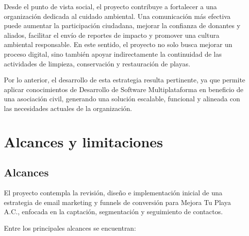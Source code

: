 Desde el punto de vista social, el proyecto contribuye a fortalecer a una organización dedicada al cuidado ambiental. Una comunicación más efectiva puede aumentar la participación ciudadana, mejorar la confianza de donantes y aliados, facilitar el envío de reportes de impacto y promover una cultura ambiental responsable. En este sentido, el proyecto no solo busca mejorar un proceso digital, sino también apoyar indirectamente la continuidad de las actividades de limpieza, conservación y restauración de playas.

Por lo anterior, el desarrollo de esta estrategia resulta pertinente, ya que permite aplicar conocimientos de Desarrollo de Software Multiplataforma en beneficio de una asociación civil, generando una solución escalable, funcional y alineada con las necesidades actuales de la organización.

\section{Alcances y limitaciones}

\subsection{Alcances}

El proyecto contempla la revisión, diseño e implementación inicial de una estrategia de email marketing y funnels de conversión para Mejora Tu Playa A.C., enfocada en la captación, segmentación y seguimiento de contactos.

Entre los principales alcances se encuentran:

